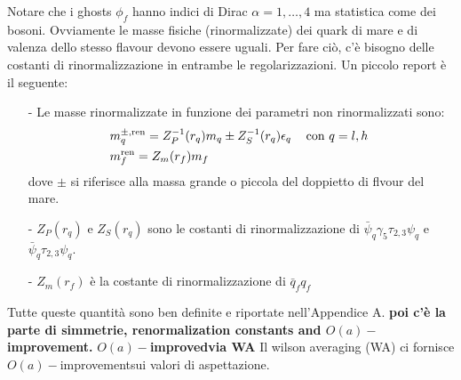 \documentclass[12pt,a4paper,openright]{article}
\newcommand{\colg}{\textcolor{PineGreen}}
\newcommand{\ren}{{\text{ren}}}
\newcommand{\oai}{$O(a)-$improved}
\newcommand{\oait}{$O(a)-$improvement}
\begin{document}
Notare che i ghosts $\phi_f$ hanno indici di Dirac $\alpha = 1,\dots,4$ ma statistica come dei bosoni.
Ovviamente le masse fisiche (rinormalizzate) dei quark di mare e di valenza dello stesso flavour devono essere uguali.
Per fare ciò, c'è bisogno delle costanti di rinormalizzazione in entrambe le regolarizzazioni.
Un piccolo report è il seguente:
\begin{itemize}
  \item [-] Le masse rinormalizzate in funzione dei parametri non rinormalizzati sono:
            \begin{equation*}
              \begin{aligned}
                &m_q^{\pm,\ren} = Z_P^{-1} (r_q) m_q \pm Z_S^{-1} (r_q) \epsilon_q \hspace*{3mm} \text{ con $q=l,h$ }\\
                &m_f^{\ren} = Z_m (r_f) m_f
              \end{aligned}
            \end{equation*}
            dove $\pm$ si riferisce alla massa grande o piccola del doppietto di flvour del mare.
  \item [-] $Z_P(r_q)$ e $Z_S(r_q)$ sono le costanti di rinormalizzazione di $\bar\psi_q\gamma_5 \tau_{2,3} \psi_q$ e $\bar\psi_q \tau_{2,3} \psi_q$.
  \item [-] $Z_m (r_f)$ è la costante di rinormalizzazione di $\bar q_f q_f$
\end{itemize}
Tutte queste quantità sono ben definite e \colg{riportate nell'Appendice A}.
\newline\newline
{\bf poi c'è la parte di simmetrie, renormalization constants and \oait.}
\newline\newline
{\bf\oai via WA}
Il wilson averaging (WA) ci fornisce \oait\space sui valori di aspettazione.
\end{document}
